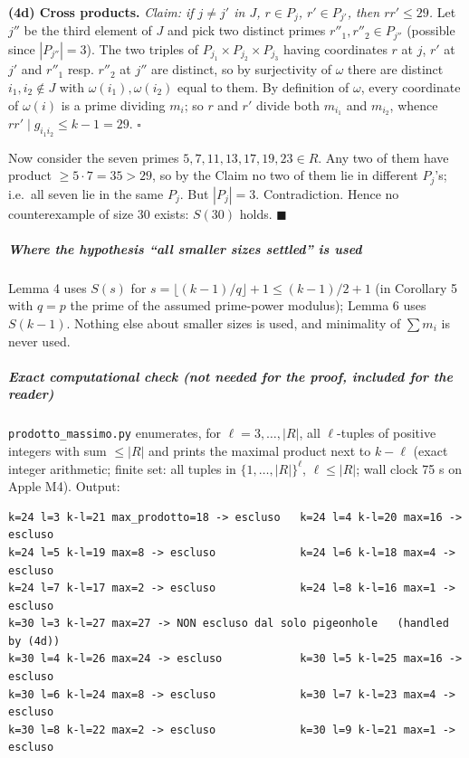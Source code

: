 \documentclass[11pt,a4paper]{article}
\begin{document}
\textbf{(4d) Cross products.} \emph{Claim: if \(j\ne j'\) in \(J\),
\(r\in P_j\), \(r'\in P_{j'}\), then \(r r'\le 29\).} Let \(j''\) be the
third element of \(J\) and pick two distinct primes
\(r''_1,r''_2\in P_{j''}\) (possible since \(|P_{j''}|=3\)). The two
triples of \(P_{j_1}\times P_{j_2}\times P_{j_3}\) having coordinates
\(r\) at \(j\), \(r'\) at \(j'\) and \(r''_1\) resp. \(r''_2\) at
\(j''\) are distinct, so by surjectivity of \(\omega\) there are
distinct \(i_1,i_2\notin J\) with \(\omega(i_1),\omega(i_2)\) equal to
them. By definition of \(\omega\), every coordinate of \(\omega(i)\) is
a prime dividing \(m_i\); so \(r\) and \(r'\) divide both \(m_{i_1}\)
and \(m_{i_2}\), whence \(rr'\mid g_{i_1i_2}\le k-1=29\). \(\square\)

Now consider the seven primes \(5,7,11,13,17,19,23\in R\). Any two of
them have product \(\ge5\cdot7=35>29\), so by the Claim no two of them
lie in different \(P_j\)'s; i.e.~all seven lie in the same \(P_j\). But
\(|P_j|=3\). Contradiction. Hence no counterexample of size \(30\)
exists: \(S(30)\) holds. \(\blacksquare\)

\subparagraph{Where the hypothesis ``all smaller sizes settled'' is
used}\label{where-the-hypothesis-all-smaller-sizes-settled-is-used}

Lemma 4 uses \(S(s)\) for \(s=\lfloor (k-1)/q\rfloor+1\le (k-1)/2+1\)
(in Corollary 5 with \(q=p\) the prime of the assumed prime-power
modulus); Lemma 6 uses \(S(k-1)\). Nothing else about smaller sizes is
used, and minimality of \(\sum m_i\) is never used.

\subparagraph{Exact computational check (not needed for the proof,
included for the
reader)}\label{exact-computational-check-not-needed-for-the-proof-included-for-the-reader}

\texttt{prodotto\_massimo.py} enumerates, for \(\ell=3,\dots,|R|\), all
\(\ell\)-tuples of positive integers with sum \(\le|R|\) and prints the
maximal product next to \(k-\ell\) (exact integer arithmetic; finite
set: all tuples in \(\{1,\dots,|R|\}^\ell\), \(\ell\le|R|\); wall clock
75 s on Apple M4). Output:

\begin{verbatim}
k=24 l=3 k-l=21 max_prodotto=18 -> escluso   k=24 l=4 k-l=20 max=16 -> escluso
k=24 l=5 k-l=19 max=8 -> escluso             k=24 l=6 k-l=18 max=4 -> escluso
k=24 l=7 k-l=17 max=2 -> escluso             k=24 l=8 k-l=16 max=1 -> escluso
k=30 l=3 k-l=27 max=27 -> NON escluso dal solo pigeonhole   (handled by (4d))
k=30 l=4 k-l=26 max=24 -> escluso            k=30 l=5 k-l=25 max=16 -> escluso
k=30 l=6 k-l=24 max=8 -> escluso             k=30 l=7 k-l=23 max=4 -> escluso
k=30 l=8 k-l=22 max=2 -> escluso             k=30 l=9 k-l=21 max=1 -> escluso
\end{verbatim}
\end{document}
